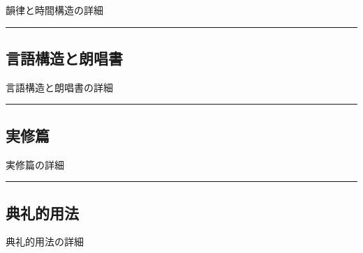 \documentclass[
  japanese,
]{article}
\begin{document}
韻律と時間構造の詳細

\begin{center}\rule{0.5\linewidth}{0.5pt}\end{center}

\subsection{言語構造と朗唱書}\label{chapter7}

言語構造と朗唱書の詳細

\begin{center}\rule{0.5\linewidth}{0.5pt}\end{center}

\subsection{実修篇}\label{chapter8}

実修篇の詳細

\begin{center}\rule{0.5\linewidth}{0.5pt}\end{center}

\subsection{典礼的用法}\label{chapter9}

典礼的用法の詳細
\end{document}
